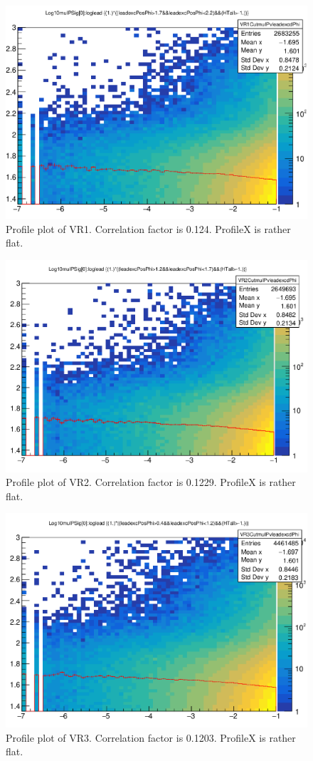 \begin{figure}[h!]
  \caption{Profile plot of VR1. Correlation factor is 0.124. ProfileX is rather flat.}
  \label{fig:valcar1}
  \centering
  \includegraphics[width=0.65\linewidth]{figs/VR1.png}

\end{figure}

\begin{figure}[h!]
  \caption{Profile plot of VR2. Correlation factor is 0.1229. ProfileX is rather flat.}
  \label{fig:valcar2}
  \centering
  \includegraphics[width=0.65\linewidth]{figs/VR2.png}

\end{figure}

\begin{figure}[h!]
  \caption{Profile plot of VR3. Correlation factor is 0.1203. ProfileX is rather flat.}
  \label{fig:valcar3}
  \centering
  \includegraphics[width=0.65\linewidth]{figs/VR3.png}

\end{figure}


